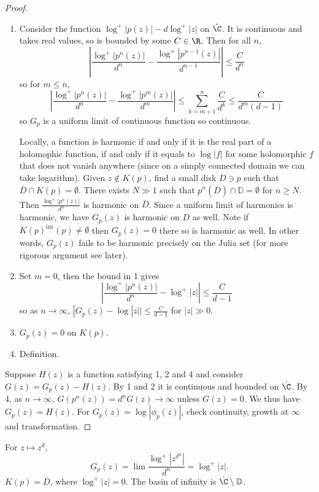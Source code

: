 \documentclass[a4paper]{article}
\newcommand{\D}{\mathbb{D}}
\begin{document}
\begin{proof}\leavevmode
  \begin{enumerate}
  \item Consider the function \(\log^+|p(z)| - d \log^+|z|\) on \(\hat \C\). It is continuous and takes real values, so is bounded by some \(C \in \R\). Then for all \(n\),
    \[
      \left| \frac{\log^+|p^n(z)|}{d^n} - \frac{\log^+|p^{n - 1}(z)|}{d^{n - 1}}\right| \leq \frac{C}{d^n}
    \]
    so for \(m \leq n\),
    \[
      \left| \frac{\log^+|p^n(z)|}{d^n} - \frac{\log^+|p^m(z)|}{d^m}\right| \leq \sum_{k = m + 1}^n \frac{C}{d^k} \leq \frac{C}{d^m (d - 1)}
    \]
    so \(G_p\) is a uniform limit of continuous function so continuous.

    Locally, a function is harmonic if and only if it is the real part of a holomophic function, if and only if it equals to \(\log |f|\) for some holomorphic \(f\) that does not vanish anywhere (since on a simply connected domain we can take logarithm). Given \(z \notin K(p)\), find a small disk \(D \ni p\) such that \(\overline D \cap K(p) = \emptyset\). There exists \(N \gg 1\) such that \(p^n(\overline D) \cap \D = \emptyset\) for \(n \geq N\). Then \(\frac{\log^+ |p^n(z)|}{d^n}\)  is harmonic on \(\overline D\). Since a uniform limit of harmonics is harmonic, we have \(G_p(z)\) is harmonic on \(D\) as well. Note if \(K(p)^{\mathrm{int}}(p) \ne \emptyset\) then \(G_p(z) = 0\) there so is harmonic as well. In other words, \(G_p(z)\) fails to be harmonic precisely on the Julia set (for more rigorous argument see later).
  \item Set \(m = 0\), then the bound in 1 gives
    \[
      \left| \frac{\log^+ |p^n(z)|}{d^n} - \log^+|z| \right| \leq \frac{C}{d - 1}
    \]
    so as \(n \to \infty\), \(|G_p(z) - \log |z|| \leq \frac{C}{d - 1}\) for \(|z| \gg 0\).
  \item \(G_p(z) = 0\) on \(K(p)\).
  \item Definition.
  \end{enumerate}

  Suppose \(H(z)\) is a function satisfying 1, 2 and 4 and consider \(G(z) = G_p(z) - H(z)\). By 1 and 2 it is continuous and bounded on \(\hat \C\). By 4, as \(n \to \infty\), \(G(p^n(z)) = d^n G(z) \to \infty\) unless \(G(z) = 0\). We thus have \(G_p(z) = H(z)\). For \(G_p(z) = \log |\phi_p(z)|\), check continuity, growth at \(\infty\) and transformation.
\end{proof}

\begin{eg}
  For \(z \mapsto z^d\),
  \[
    G_p(z) = \lim \frac{\log^+|z^{d^n}|}{d^n} = \log^+|z|.
  \]
  \(K(p) = \overline D\), where \(\log^+ |z| = 0\). The basin of infinity is \(\hat \C \setminus \D\).
\end{eg}
\end{document}
